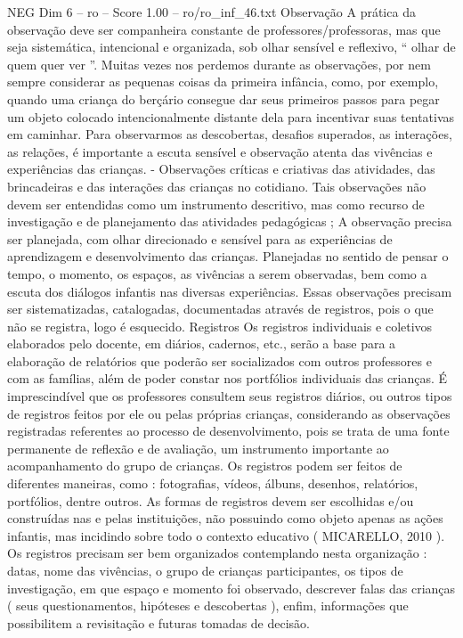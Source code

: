 \begin{textsample}{NEG Dim 6 – ro – Score 1.00 – ro/ro\_inf\_46.txt}  \label{ex:f6_neg_155}
Observação A prática da observação deve ser companheira constante de professores/professoras, mas que seja sistemática, intencional e organizada, sob olhar sensível e reflexivo, “ olhar de quem quer ver ”.
Muitas vezes nos perdemos durante as observações, por nem sempre considerar as pequenas coisas da primeira infância, como, por exemplo, quando uma criança do berçário consegue dar seus primeiros passos para pegar um objeto colocado intencionalmente distante dela para incentivar suas tentativas em caminhar.
Para observarmos as descobertas, desafios superados, as interações, as relações, é importante a escuta sensível e observação atenta das vivências e experiências das crianças. - Observações críticas e criativas das atividades, das brincadeiras e das interações das crianças no cotidiano.
Tais observações não devem ser entendidas como um instrumento descritivo, mas como recurso de investigação e de planejamento das atividades pedagógicas ; A observação precisa ser planejada, com olhar direcionado e sensível para as experiências de aprendizagem e desenvolvimento das crianças.
Planejadas no sentido de pensar o tempo, o momento, os espaços, as vivências a serem observadas, bem como a escuta dos diálogos infantis nas diversas experiências.
Essas observações precisam ser sistematizadas, catalogadas, documentadas através de registros, pois o que não se registra, logo é esquecido.
Registros Os registros individuais e coletivos elaborados pelo docente, em diários, cadernos, etc., serão a base para a elaboração de relatórios que poderão ser socializados com outros professores e com as famílias, além de poder constar nos portfólios individuais das crianças.
É imprescindível que os professores consultem seus registros diários, ou outros tipos de registros feitos por ele ou pelas próprias crianças, considerando as observações registradas referentes ao processo de desenvolvimento, pois se trata de uma fonte permanente de reflexão e de avaliação, um instrumento importante ao acompanhamento do grupo de crianças.
Os registros podem ser feitos de diferentes maneiras, como : fotografias, vídeos, álbuns, desenhos, relatórios, portfólios, dentre outros.
As formas de registros devem ser escolhidas e/ou construídas nas e pelas instituições, não possuindo como objeto apenas as ações infantis, mas incidindo sobre todo o contexto educativo ( MICARELLO, 2010 ).
Os registros precisam ser bem organizados contemplando nesta organização : datas, nome das vivências, o grupo de crianças participantes, os tipos de investigação, em que espaço e momento foi observado, descrever falas das crianças ( seus questionamentos, hipóteses e descobertas ), enfim, informações que possibilitem a revisitação e futuras tomadas de decisão.

\end{textsample}
